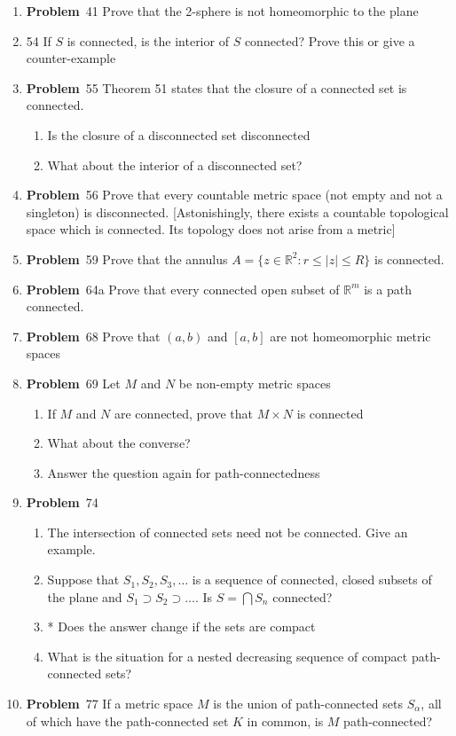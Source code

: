 \documentclass[12pt]{amsart}
\newcommand{\benu}{\begin{enumerate}}
\newcommand{\eenu}{\end{enumerate}}
\theoremstyle{definition}
\newcommand{\mbR}{\mathbb{R}}
\newcommand{\itep}{\item {\bfseries Problem}\ }
\begin{document}
\begin{enumerate}[series=p]
\itep 41
Prove that the 2-sphere is not homeomorphic to the plane

\newpage
\item 54
If $S$ is connected, is the interior of $S$ connected?  Prove this or give a counter-example

\newpage

\itep 55
Theorem 51 states that the closure of a connected set is connected.
	\benu
		\item Is the closure of a disconnected set disconnected
		\item What about the interior of a disconnected set?
	\eenu
\newpage

\itep 56
Prove that every countable metric space (not empty and not a singleton) is disconnected.  [Astonishingly, there exists a countable topological space which is connected.  Its topology does not arise from a metric]

\newpage
\itep 59
Prove that the annulus $A = \{z \in \mbR^2: r \leq |z| \leq R\}$ is connected.

\newpage
\itep 64a
Prove that every connected open subset of $\mbR^m$ is a path connected.

\newpage
\itep 68
Prove that $(a,b)$ and $[a,b]$ are not homeomorphic metric spaces


\newpage

\itep 69
Let $M$ and $N$ be non-empty metric spaces
	\benu
		\item If $M$ and $N$ are connected, prove that $M \times N$ is connected
		\item What about the converse?
		\item Answer the question again for path-connectedness
	\eenu
\newpage


\itep 74
	\benu
		\item The intersection of connected sets need not be connected.  Give an example.
		\item Suppose that $S_1, S_2, S_3, \dots$ is a sequence of connected, closed subsets of the plane and $S_1 \supset S_2 \supset \dots$.  Is $S = \bigcap S_n$ connected?
		\item * Does the answer change if the sets are compact
		\item What is the situation for a nested decreasing sequence of compact path-connected sets?
	\eenu
\newpage


\itep 77
If a metric space $M$ is the union of path-connected sets $S_\alpha$, all of which have the path-connected set $K$ in common, is $M$ path-connected?



\end{enumerate}
\end{document}
